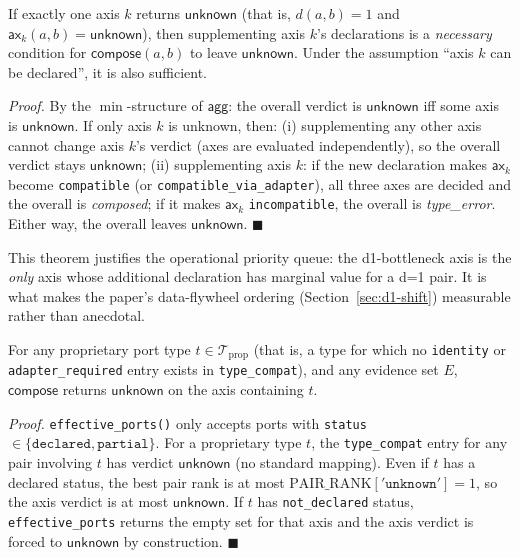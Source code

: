 \documentclass[review]{elsarticle}
\begin{document}
\begin{theorem}
\label{thm:bottleneck}
If exactly one axis $k$ returns $\mathsf{unknown}$
(that is, $d(a, b) = 1$ and $\mathsf{ax}_k(a, b) =
\mathsf{unknown}$), then supplementing axis $k$'s declarations is
a \emph{necessary} condition for $\mathsf{compose}(a, b)$ to leave
$\mathsf{unknown}$. Under the assumption ``axis $k$ can be
declared'', it is also sufficient.
\end{theorem}

\emph{Proof.} By the $\min$-structure of $\mathsf{agg}$:
the overall verdict is $\mathsf{unknown}$ iff some axis is
$\mathsf{unknown}$. If only axis $k$ is unknown, then:
(i) supplementing any other axis cannot change axis $k$'s verdict
(axes are evaluated independently), so the overall verdict stays
$\mathsf{unknown}$;
(ii) supplementing axis $k$: if the new declaration makes
$\mathsf{ax}_k$ become \texttt{compatible} (or
\texttt{compatible\_via\_adapter}), all three axes are decided and
the overall is \emph{composed}; if it makes $\mathsf{ax}_k$
\texttt{incompatible}, the overall is \emph{type\_error}. Either
way, the overall leaves $\mathsf{unknown}$. $\blacksquare$

This theorem justifies the operational priority queue: the
d1-bottleneck axis is the \emph{only} axis whose additional
declaration has marginal value for a d=1 pair. It is what makes
the paper's data-flywheel ordering (Section~\ref{sec:d1-shift})
measurable rather than anecdotal.

\begin{theorem}
\label{thm:undecidable}
For any proprietary port type $t \in \mathcal{T}_{\mathrm{prop}}$
(that is, a type for which no \texttt{identity} or
\texttt{adapter\_required} entry exists in \texttt{type\_compat}),
and any evidence set $E$, $\mathsf{compose}$ returns
$\mathsf{unknown}$ on the axis containing $t$.
\end{theorem}

\emph{Proof.} \texttt{effective\_ports()} only accepts ports with
\texttt{status} $\in \{\texttt{declared}, \texttt{partial}\}$.
For a proprietary type $t$, the \texttt{type\_compat} entry for
any pair involving $t$ has verdict $\mathsf{unknown}$ (no standard
mapping). Even if $t$ has a declared status, the best pair rank is
at most $\mathrm{PAIR\_RANK}['\texttt{unknown}'] = 1$, so the axis
verdict is at most $\mathsf{unknown}$. If $t$ has
\texttt{not\_declared} status, \texttt{effective\_ports} returns
the empty set for that axis and the axis verdict is forced to
$\mathsf{unknown}$ by construction. $\blacksquare$
\end{document}
